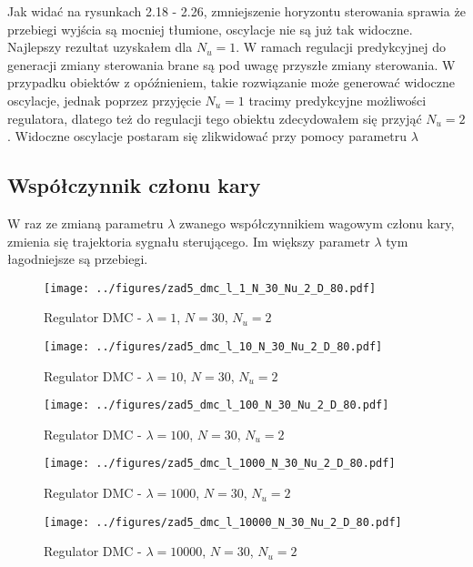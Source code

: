 \documentclass[a4paper,titlepage,11pt,floatssmall]{mwrep}
\begin{document}
Jak widać na rysunkach 2.18 - 2.26, zmniejszenie horyzontu sterowania sprawia że przebiegi wyjścia są mocniej tłumione, oscylacje nie są już tak widoczne. Najlepszy rezultat uzyskałem dla $N_u = 1$. W ramach regulacji predykcyjnej do generacji zmiany sterowania brane są pod uwagę przyszłe zmiany sterowania. W przypadku obiektów z opóźnieniem, takie rozwiązanie może generować widoczne oscylacje, jednak poprzez przyjęcie $N_u = 1$ tracimy predykcyjne możliwości regulatora, dlatego też do regulacji tego obiektu zdecydowałem się przyjąć $N_u = 2$. Widoczne oscylacje postaram się zlikwidować przy pomocy parametru $\lambda$

\subsection{Współczynnik członu kary}
W raz ze zmianą parametru $\lambda$ zwanego współczynnikiem wagowym członu kary, zmienia się trajektoria sygnału sterującego. Im większy parametr $\lambda$ tym łagodniejsze są przebiegi.

\begin{figure}[H]
\centering
\texttt{[image: ../figures/zad5\_dmc\_l\_1\_N\_30\_Nu\_2\_D\_80.pdf]}
\caption{Regulator DMC - $\lambda = 1$, $N = 30$, $N_{u} = 2$}
\end{figure}
\newpage

\begin{figure}[H]
\centering
\texttt{[image: ../figures/zad5\_dmc\_l\_10\_N\_30\_Nu\_2\_D\_80.pdf]}
\caption{Regulator DMC - $\lambda = 10$, $N = 30$, $N_{u} = 2$}
\end{figure}

\begin{figure}[H]
\centering
\texttt{[image: ../figures/zad5\_dmc\_l\_100\_N\_30\_Nu\_2\_D\_80.pdf]}
\caption{Regulator DMC - $\lambda = 100$, $N = 30$, $N_{u} = 2$}
\end{figure}

\begin{figure}[H]
\centering
\texttt{[image: ../figures/zad5\_dmc\_l\_1000\_N\_30\_Nu\_2\_D\_80.pdf]}
\caption{Regulator DMC - $\lambda = 1000$, $N = 30$, $N_{u} = 2$}
\end{figure}

\begin{figure}[H]
\centering
\texttt{[image: ../figures/zad5\_dmc\_l\_10000\_N\_30\_Nu\_2\_D\_80.pdf]}
\caption{Regulator DMC - $\lambda = 10000$, $N = 30$, $N_{u} = 2$}
\end{figure}
\end{document}
